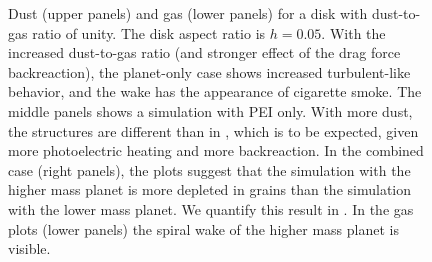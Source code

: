 \documentclass[onecolumn]{report}
\begin{document}
\begin{figure}
  \begin{center}
  \end{center}
  \caption{Dust (upper panels) and gas (lower panels) for a disk with
    dust-to-gas ratio of unity. The disk aspect ratio is
    $h=0.05$. With the increased dust-to-gas ratio (and stronger
    effect of the drag force backreaction), the planet-only case shows increased
    turbulent-like behavior, and the wake has the appearance of
    cigarette smoke. The middle panels shows a simulation with PEI
    only. With more dust, the structures are different than in
    , which is to be expected, given
    more photoelectric heating and more backreaction.
    In the combined case (right panels), the plots suggest that
    the simulation with the higher mass planet is more depleted in
    grains than the simulation with the lower mass planet. We quantify
    this result in . In the gas
    plots (lower panels) the spiral wake of the higher mass planet is
    visible.}
  \label{fig:eps1dustgas}
  \end{figure}
\end{document}
